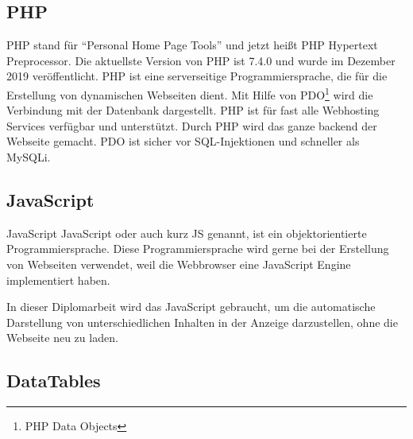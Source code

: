 
\subsection{PHP}
PHP stand f\"{u}r \textquotedblleft{}Personal Home Page Tools\textquotedblright{} und jetzt hei\ss{}t PHP Hypertext Preprocessor. Die aktuellste Version von PHP ist 7.4.0 und wurde im Dezember 2019 ver\"{o}ffentlicht. PHP ist eine serverseitige Programmiersprache, die f\"{u}r die Erstellung von dynamischen Webseiten dient. Mit Hilfe von PDO\footnote{PHP Data Objects} wird die Verbindung mit der Datenbank dargestellt. PHP ist f\"{u}r fast alle Webhosting Services verf\"{u}gbar und unterst\"{u}tzt. 
Durch PHP wird das ganze backend der Webseite gemacht. PDO ist sicher vor SQL-Injektionen und schneller als MySQLi.





\subsection{JavaScript}
JavaScript JavaScript oder auch kurz JS genannt, ist ein objektorientierte Programmiersprache. Diese Programmiersprache wird gerne bei der Erstellung von Webseiten verwendet, weil die Webbrowser eine JavaScript Engine implementiert haben. \cite{40_js}

In dieser Diplomarbeit wird das JavaScript gebraucht, um die automatische Darstellung von unterschiedlichen Inhalten in der Anzeige darzustellen, ohne die Webseite neu zu laden.





\subsection{DataTables}

